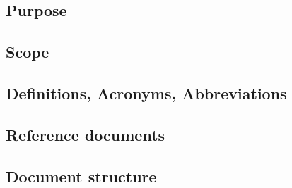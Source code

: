 \subsection{Purpose}
\subsection{Scope}
\subsection{Definitions, Acronyms, Abbreviations}
\subsection{Reference documents}
\subsection{Document structure}

\clearpage